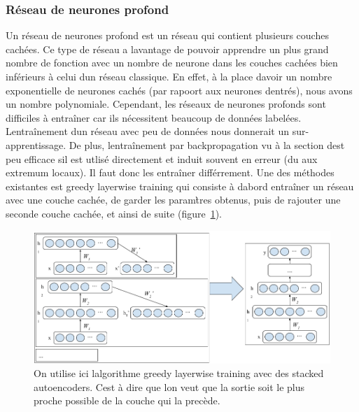 \documentclass[11pt]{sdm}
\begin{document}
			\medbreak

		\subsubsection{R\'eseau de neurones profond}
			Un r\'eseau de neurones profond est un r\'eseau qui contient plusieurs couches cach\'ees. Ce type de r\'eseau a l\textquotesingle avantage de pouvoir apprendre un plus grand nombre de fonction avec un nombre de neurone dans les couches cach\'ees bien inf\'erieurs \`a celui d\textquotesingle un r\'eseau classique. En effet, \`a la place d\textquotesingle avoir un nombre exponentielle de neurones cach\'es (par rapoort aux neurones d\textquotesingle entr\'es), nous avons un nombre polynomiale.
			Cependant, les r\'eseaux de neurones profonds sont difficiles \`a entra\^iner car ils n\'ecessitent beaucoup de donn\'ees label\'ees. L\textquotesingle entra\^inement d\textquotesingle un r\'eseau avec peu de donn\'ees nous donnerait un sur-apprentissage. De plus, l\textquotesingle entra\^inement par backpropagation vu \`a la section d\textquotesingle est peu efficace s\textquotesingle il est utlis\'e directement et induit souvent en erreur (du aux extremum locaux). Il faut donc les entra\^iner diff\'errement.
			Une des m\'ethodes existantes est greedy layerwise training qui consiste \`a d\textquotesingle abord entra\^iner un r\'eseau avec une couche cach\'ee, de garder les param\`tres obtenus, puis de rajouter une seconde couche cach\'ee, et ainsi de suite (figure~\ref{fig:trainDeepNet}).

			\begin{figure}[!ht]
				\centering
				\includegraphics[scale=0.5,natwidth=919,natheight=412]{figures/trainDeepNetByGreedyLayerWise.png}
				\caption{On utilise ici l\textquotesingle algorithme greedy layerwise training avec des stacked autoencoders. C\textquotesingle est \`a dire que l\textquotesingle on veut que la sortie soit le plus proche possible de la couche qui la prec\`ede.}
				\label{fig:trainDeepNet}
			\end{figure}
\end{document}
